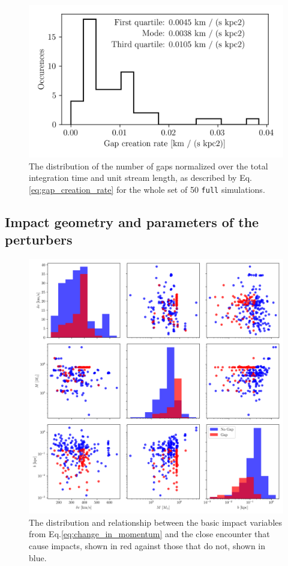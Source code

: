 \documentclass[draft]{aa}
\begin{document}
    \begin{figure}
      \centering
      \includegraphics[width=\linewidth]{gap_creation_rate.png}
      \caption{The distribution of the number of gaps normalized over the total integration time and unit stream length, as described by Eq.\ref{eq:gap_creation_rate} for the whole set of 50 \texttt{full} simulations. }
      \label{fig:gapcreationrate}
    \end{figure}

   
  \subsection{Impact geometry and parameters of the perturbers}\label{sect:geometry}
  
    \begin{figure}
      \centering
      \includegraphics[width=\linewidth]{impact_geometry_statistics.png}
      \caption{The distribution and relationship between the basic impact variables from Eq.\ref{eq:change_in_momentum} and the close encounter that cause impacts, shown in red against those that do not, shown in blue. }
      \label{fig:impact_geometry_statistics}    
    \end{figure}
\end{document}
